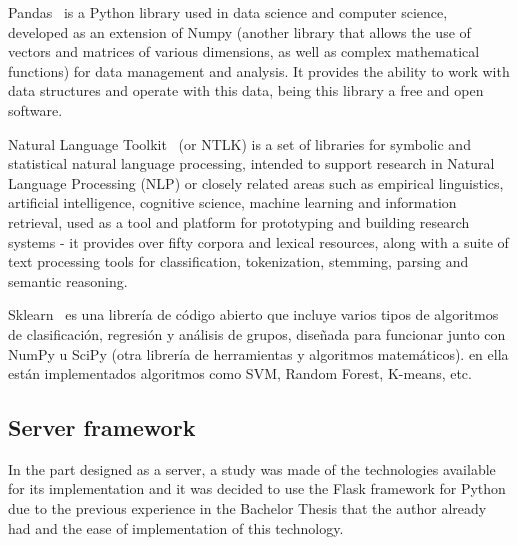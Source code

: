 Pandas~\cite{pandasPy20:online} is a Python library used in data science and computer science, developed as an extension of Numpy (another library that allows the use of vectors and matrices of various dimensions, as well as complex mathematical functions) for data management and analysis. It provides the ability to work with data structures and operate with this data, being this library a free and open software.

Natural Language Toolkit~\cite{NLTKNatu6:online} (or NTLK) is a set of libraries for symbolic and statistical natural language processing, intended to support research in Natural Language Processing (NLP) or closely related areas such as empirical linguistics, artificial intelligence, cognitive science, machine learning and information retrieval, used as a tool and platform for prototyping and building research systems - it provides over fifty corpora and lexical resources, along with a suite of text processing tools for classification, tokenization, stemming, parsing and semantic reasoning.

Sklearn~\cite{scikitle66:online} es una librería de código abierto que incluye varios tipos de algoritmos de clasificación, regresión y análisis de grupos, diseñada para funcionar junto con NumPy u SciPy (otra librería de herramientas y algoritmos matemáticos). en ella están implementados algoritmos como SVM, Random Forest, K-means, etc.





\subsection{Server framework}
In the part designed as a server, a study was made of the technologies available for its implementation and it was decided to use the Flask framework for Python due to the previous experience in the Bachelor Thesis that the author already had and the ease of implementation of this technology.

